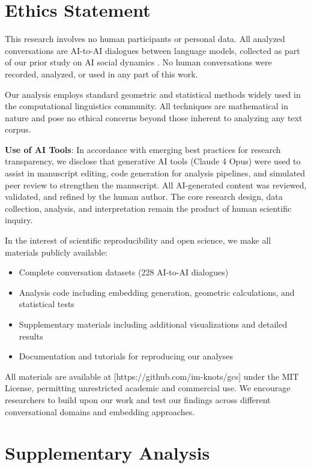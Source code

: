 \documentclass[11pt,letterpaper]{article}
\begin{document}
\section{Ethics Statement}

This research involves no human participants or personal data. All analyzed conversations are AI-to-AI dialogues between language models, collected as part of our prior study on AI social dynamics \citep{garcia2025peer}. No human conversations were recorded, analyzed, or used in any part of this work.

Our analysis employs standard geometric and statistical methods widely used in the computational linguistics community. All techniques are mathematical in nature and pose no ethical concerns beyond those inherent to analyzing any text corpus.

\textbf{Use of AI Tools}: In accordance with emerging best practices for research transparency, we disclose that generative AI tools (Claude 4 Opus) were used to assist in manuscript editing, code generation for analysis pipelines, and simulated peer review to strengthen the manuscript. All AI-generated content was reviewed, validated, and refined by the human author. The core research design, data collection, analysis, and interpretation remain the product of human scientific inquiry.

In the interest of scientific reproducibility and open science, we make all materials publicly available:
\begin{itemize}
\item Complete conversation datasets (228 AI-to-AI dialogues)
\item Analysis code including embedding generation, geometric calculations, and statistical tests
\item Supplementary materials including additional visualizations and detailed results
\item Documentation and tutorials for reproducing our analyses
\end{itemize}

All materials are available at [https://github.com/im-knots/gcs] under the MIT License, permitting unrestricted academic and commercial use. We encourage researchers to build upon our work and test our findings across different conversational domains and embedding approaches.




\appendix

\section{Supplementary Analysis}
\end{document}
